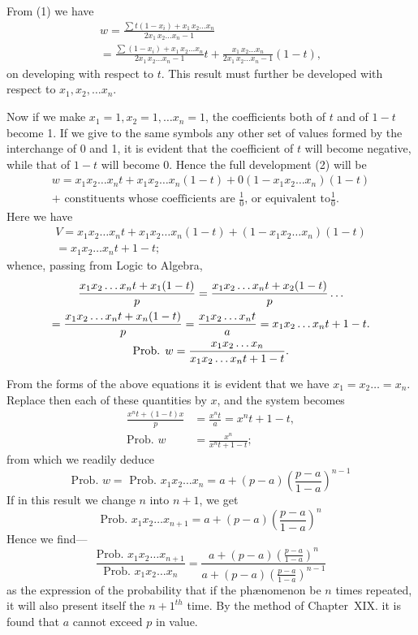 \documentclass[oneside]{book}
\begin{document}
From (1) we have
\begin{gather*}
  w = \frac{\sum t(1-x_i) + x_1\, x_2\dotsc x_n}
           {2x_1\, x_2\dotsc x_n - 1}
\\
  = \frac{\sum (1-x_i) + x_1\,x_2\dotsc x_n}
         {2x_1\, x_2\dotsc x_n - 1} t
  + \frac{x_1\, x_2\dotsc x_n}
         {2x_1\, x_2\dotsc x_n - 1} (1-t),   \tag{2}
\end{gather*}
on developing with respect to $t$. This result must further be
developed with respect to $x_1, x_2,\dotsc x_n$.

Now if we make $x_1 = 1, x_2 = 1, \dotsc x_n = 1$, the coefficients both
of $t$ and of $1-t$ become 1. If we give to the same symbols any
other set of values formed by the interchange of 0 and 1, it is
evident that the coefficient of $t$ will become negative, while that
of $1-t$ will become 0. Hence the full development (2) will be
\begin{multline*}
  w = x_1 x_2 \dotsc x_n t + x_1 x_2 \dotsc x_n(1-t)
    + 0(1 - x_1 x_2 \dotsc x_n)(1-t)   \\
  + \text{ constituents whose coefficients are $\frac{1}{0}$, or equivalent to$\frac{1}{0}$.}
\end{multline*}
Here we have
\begin{multline*}
  V = x_1 x_2 \dotsc x_n t + x_1 x_2 \dotsc x_n (1-t)
    + (1 - x_1 x_2 \dotsc x_n) (1-t)   \\
  = x_1 x_2 \dotsc x_n t + 1 - t;
\end{multline*}
whence, passing from Logic to Algebra,
\begin{multline*}
    \frac{x_1 x_2 \dotsc x_n t + x_1(1-t)}{p}
  = \frac{x_1 x_2 \dotsc x_n t + x_2(1-t)}{p} \dotso
\\ \hfill
  = \frac{x_1 x_2 \dotsc x_n t + x_n(1-t)}{p}
  = \frac{x_1 x_2 \dotsc x_n t}{a} = x_1 x_2 \dotsc x_n t + 1 - t.
\\ \hfill
  \text{Prob. }w
= \frac{x_1 x_2 \dotsc x_n}{x_1 x_2 \dotsc x_n t + 1 - t}. \hfill
\end{multline*}

From the forms of the above equations it is evident that we
have $x_1 = x_2 \dotso = x_n$. Replace then each of these quantities by $x$,
and the system becomes
\begin{align*}
  \frac{x^n t + (1-t)x}{p} &= \frac{x^n t}{a} = x^n t + 1 - t,   \\
  \text{Prob. }w &= \frac{x^n}{x^n t + 1 - t};
\end{align*}
from which we readily deduce
\[
  \text{Prob. }w = \text{ Prob. }x_1 x_2 \dotsc x_n
  = a + (p-a)\left( \frac{p-a}{1-a} \right)^{n-1}
\]
If in this result we change $n$ into $n + 1$, we get
\[
  \text{Prob. }x_1 x_2 \dotsc x_{n+1}
  = a + (p-a)\left( \frac{p-a}{1-a} \right)^n
\]
Hence we find---
\[
  \frac{\text{Prob. }x_1 x_2 \dotsc x_{n+1}}
       {\text{Prob. }x_1 x_2 \dotsc x_n}
  =
  \frac{a + (p-a)\left( \frac{p-a}{1-a} \right)^n}
       {a + (p-a)\left( \frac{p-a}{1-a} \right)^{n-1}}
\tag{3}
\]
as the expression of the probability that if the ph{\ae}nomenon be $n$
times repeated, it will also present itself the $n + 1^{th}$ time. By the
method of Chapter~XIX. it is found that $a$ cannot exceed $p$ in
value.
\end{document}
